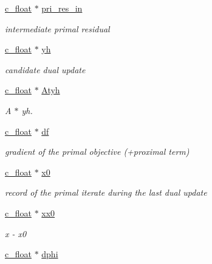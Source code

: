 \begin{Indent}
\begin{DoxyCompactItemize}
\mbox{\hyperlink{global__opts_8h_a7f1a9fda95e52979658c20a0d134fb15}{c\+\_\+float}} $\ast$ \mbox{\hyperlink{structQPALMWorkspace_a4178a4d2bfdb85f18f14e3ddfaec142c}{pri\+\_\+res\+\_\+in}}
\begin{DoxyCompactList}\small\item\em intermediate primal residual \end{DoxyCompactList}\item 
\mbox{\hyperlink{global__opts_8h_a7f1a9fda95e52979658c20a0d134fb15}{c\+\_\+float}} $\ast$ \mbox{\hyperlink{structQPALMWorkspace_a12cd413a80f3e029802beb280e76d348}{yh}}
\begin{DoxyCompactList}\small\item\em candidate dual update \end{DoxyCompactList}\item 
\mbox{\hyperlink{global__opts_8h_a7f1a9fda95e52979658c20a0d134fb15}{c\+\_\+float}} $\ast$ \mbox{\hyperlink{structQPALMWorkspace_affa4e2fe7facd4e9c1a4cb14c4103a72}{Atyh}}
\begin{DoxyCompactList}\small\item\em A\textquotesingle{} $\ast$ yh. \end{DoxyCompactList}\item 
\mbox{\hyperlink{global__opts_8h_a7f1a9fda95e52979658c20a0d134fb15}{c\+\_\+float}} $\ast$ \mbox{\hyperlink{structQPALMWorkspace_aca74b2322e2dc5427a440a39a16e2c3b}{df}}
\begin{DoxyCompactList}\small\item\em gradient of the primal objective (+proximal term) \end{DoxyCompactList}\item 
\mbox{\hyperlink{global__opts_8h_a7f1a9fda95e52979658c20a0d134fb15}{c\+\_\+float}} $\ast$ \mbox{\hyperlink{structQPALMWorkspace_aa9dafcb9c277f81bb5e6cc5e514e4a51}{x0}}
\begin{DoxyCompactList}\small\item\em record of the primal iterate during the last dual update \end{DoxyCompactList}\item 
\mbox{\hyperlink{global__opts_8h_a7f1a9fda95e52979658c20a0d134fb15}{c\+\_\+float}} $\ast$ \mbox{\hyperlink{structQPALMWorkspace_addac4a91d2b85cb9e388cd2dc65cb455}{xx0}}
\begin{DoxyCompactList}\small\item\em x -\/ x0 \end{DoxyCompactList}\item 
\mbox{\hyperlink{global__opts_8h_a7f1a9fda95e52979658c20a0d134fb15}{c\+\_\+float}} $\ast$ \mbox{\hyperlink{structQPALMWorkspace_abc9bf36aa5174f0e7839630d9bef826b}{dphi}}

\end{DoxyCompactItemize}
\end{Indent}
